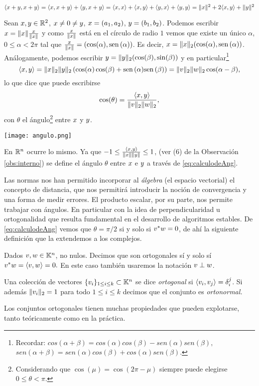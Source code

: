 \begin{ejemplo}
$\langle \xb + \yb, \xb + \yb\rangle = \langle \xb, \xb + \yb\rangle + \langle \yb, \xb + \yb\rangle = \langle \xb, \xb \rangle + \langle \xb, \yb \rangle + \langle \yb, \xb \rangle + \langle \yb, \yb\rangle = \|\xb\|^2 + 2\langle \xb, \yb \rangle + \|\yb\|^2$
\end{ejemplo}
Sean $\xb,\yb\in \R^2$, $\xb\neq \cero\neq \yb$, $\xb=(a_1,a_2)$, $\yb=(b_1,b_2)$.   Podemos escribir $\xb=\|\xb\|\frac{\xb}{\|\xb\|}$ y como $ \frac{\xb}{\|\xb\|}$ está en el círculo de radio $1$ vemos que existe un único $\alpha$, $0\le \alpha<2\pi$ tal que
$ \frac{\xb}{\|\xb\|}=(\cos(\alpha),\sen(\alpha))$. Es decir, $\xb=\|\xb\|_2(\cos(\alpha),\sen(\alpha))$. Análogamente, podemos escribir $\yb=\|\yb\|_2(\cos(\beta),\sin(\beta))$ y en particular\footnote{Recordar: $
cos(\alpha +\beta)=cos(\alpha)cos(\beta)-sen(\alpha)sen(\beta),
$
$
sen(\alpha +\beta)=sen(\alpha)cos(\beta)+cos(\alpha)sen(\beta).
$
}
$$
\langle \xb,\yb\rangle= \|\xb\|_2\|\yb\|_2\left(\cos(\alpha)\cos(\beta)+\sen(\alpha)\sen(\beta)\right)=\|\vb\|_2\|\wb\|_2\cos(\alpha-\beta),
$$
lo que dice que puede escribirse
\begin{equation}
 \label{eq:calculodeAng}
\cos(\theta)=\frac{\langle \xb,\yb\rangle}{\|\vb\|_2\|\wb\|_2},
\end{equation}
con $\theta$ el ángulo\footnote{Considerando que $\cos(\mu)=\cos(2\pi-\mu)$ siempre puede elegirse $0\le \theta < \pi$.} entre $\xb$ y $\yb$.
\begin{center}
 \texttt{[image: angulo.png]}
\end{center}
En $\mathbb R^{n}$ ocurre lo mismo. Ya que $-1\le\frac{\langle \xb, \yb\rangle}{\|\xb\|\|\yb\|}\le 1$, (ver (6) de la Observación \ref{obs:interno}) se define el ángulo $\theta$ entre $\xb$ e $\yb$ a través de \eqref{eq:calculodeAng}.



\tcc
Las normas nos han permitido incorporar al \emph{álgebra} (el espacio vectorial) el concepto de distancia, que  nos permitirá introducir la noción de convergencia y una forma de medir errores.  El producto escalar, por su parte, nos permite trabajar con ángulos. En particular con la idea de perpendicularidad u ortogonalidad que resulta  fundamental en el desarrollo de algoritmos estables.
\etcc
De \eqref{eq:calculodeAng} vemos que $\theta=\pi/2$ si y solo si $\vb^*\wb=0$, de ahí la siguiente definición que la extendemos a los complejos.
\tccdefi
\begin{defi}
 Dados $\vb,\wb\in\K^n$, no nulos. Decimos que son ortogonales sí y solo sí  $\vb^*\wb=\langle \vb,\wb\rangle=0.$ En este caso también usaremos la notación $\vb\perp \wb$.
\end{defi}
\etcc
\tccdefi
\begin{defi}
 Una colección de vectores  $\{\vb_i\}_{1\le i\le k}\subset \K^{n}$ se dice \emph{ortogonal} si $\langle \vb_i,\vb_j\rangle =\delta_i^j$. Si además $\|\vb_i\|_2=1$ para todo $1\le i\le k$ decimos que el conjunto es \emph{ortonormal.}
\end{defi}
\etcc
Los conjuntos ortogonales tienen muchas propiedades que pueden explotarse, tanto teóricamente como en la práctica.

